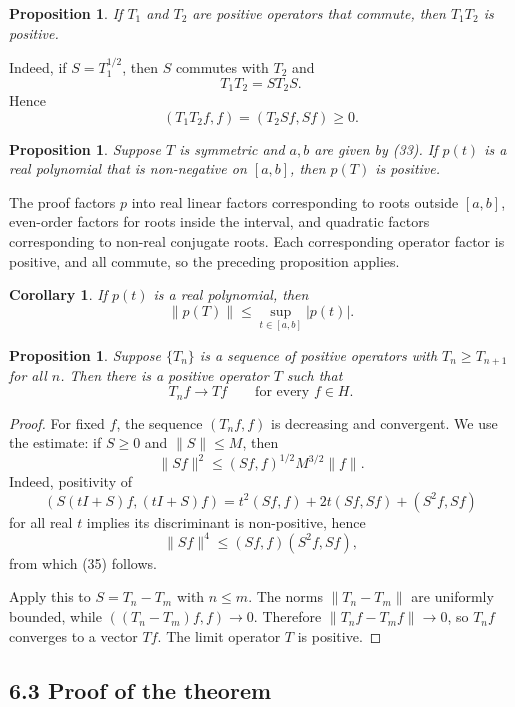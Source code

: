 \documentclass[11pt,openany]{book}
\newtheorem{corollary}[theorem]{Corollary}
\newtheorem{proposition}[theorem]{Proposition}
\begin{document}
\begin{proposition}
If $T_1$ and $T_2$ are positive operators that commute, then $T_1T_2$ is positive.
\end{proposition}

Indeed, if $S=T_1^{1/2}$, then $S$ commutes with $T_2$ and
\[
T_1T_2=ST_2S.
\]
Hence
\[
(T_1T_2f,f)=(T_2Sf,Sf)\geq0.
\]

\begin{proposition}
Suppose $T$ is symmetric and $a,b$ are given by (33). If $p(t)$ is a real polynomial that is non-negative on $[a,b]$, then $p(T)$ is positive.
\end{proposition}

The proof factors $p$ into real linear factors corresponding to roots outside $[a,b]$, even-order factors for roots inside the interval, and quadratic factors corresponding to non-real conjugate roots. Each corresponding operator factor is positive, and all commute, so the preceding proposition applies.

\begin{corollary}
If $p(t)$ is a real polynomial, then
\[
\|p(T)\|\leq\sup_{t\in[a,b]}|p(t)|.
\]
\end{corollary}

\begin{proposition}
Suppose $\{T_n\}$ is a sequence of positive operators with $T_n\geq T_{n+1}$ for all $n$. Then there is a positive operator $T$ such that
\[
T_nf\to Tf
\qquad\text{for every }f\in H.
\]
\end{proposition}

\begin{proof}
For fixed $f$, the sequence $(T_nf,f)$ is decreasing and convergent. We use the estimate: if $S\geq0$ and $\|S\|\leq M$, then
\begin{equation}
\|Sf\|^2\leq(Sf,f)^{1/2}M^{3/2}\|f\|.
\tag{35}
\end{equation}
Indeed, positivity of
\[
(S(tI+S)f,(tI+S)f)
=t^2(Sf,f)+2t(Sf,Sf)+(S^2f,Sf)
\]
for all real $t$ implies its discriminant is non-positive, hence
\[
\|Sf\|^4\leq(Sf,f)(S^2f,Sf),
\]
from which (35) follows.

Apply this to $S=T_n-T_m$ with $n\leq m$. The norms $\|T_n-T_m\|$ are uniformly bounded, while $((T_n-T_m)f,f)\to0$. Therefore $\|T_nf-T_mf\|\to0$, so $T_nf$ converges to a vector $Tf$. The limit operator $T$ is positive.
\end{proof}

\subsection*{6.3 Proof of the theorem}
\end{document}
